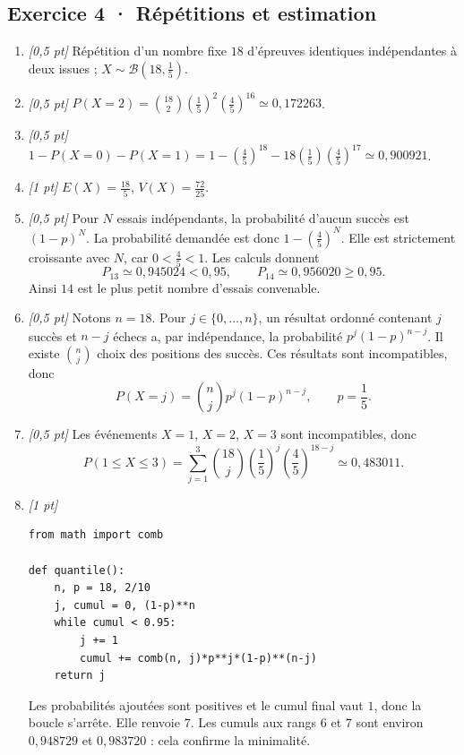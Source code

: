 \subsection*{Exercice 4 · Répétitions et estimation}\begin{enumerate}

\item \textit{[0{,}5 pt]} Répétition d'un nombre fixe $18$ d'épreuves identiques indépendantes à deux issues ; $X\sim\mathcal B(18,\frac{1}{5})$.

\item \textit{[0{,}5 pt]} $P(X=2)=\binom{18}2(\frac{1}{5})^2(\frac{4}{5})^{16}\simeq0{,}172263$.

\item \textit{[0{,}5 pt]} $1-P(X=0)-P(X=1)=1-(\frac{4}{5})^{18}-18(\frac{1}{5})(\frac{4}{5})^{17}\simeq0{,}900921$.

\item \textit{[1 pt]} $E(X)=\frac{18}{5}$, $V(X)=\frac{72}{25}$.

\item \textit{[0{,}5 pt]} Pour $N$ essais indépendants, la probabilité d'aucun succès est $(1-p)^N$. La probabilité demandée est donc $1-(\frac{4}{5})^N$. Elle est strictement croissante avec $N$, car $0<\frac{4}{5}<1$. Les calculs donnent
\[P_{13}\simeq0{,}945024<0{,}95,\qquad P_{14}\simeq0{,}956020\ge0{,}95.\]
Ainsi $14$ est le plus petit nombre d'essais convenable.

\item \textit{[0{,}5 pt]} Notons $n=18$. Pour $j\in\{0,\ldots,n\}$, un résultat ordonné contenant $j$ succès et $n-j$ échecs a, par indépendance, la probabilité $p^j(1-p)^{n-j}$. Il existe $\binom nj$ choix des positions des succès. Ces résultats sont incompatibles, donc
\[P(X=j)=\binom nj p^j(1-p)^{n-j},\qquad p=\frac{1}{5}.\]

\item \textit{[0{,}5 pt]} Les événements $X=1$, $X=2$, $X=3$ sont incompatibles, donc
\[P(1\le X\le3)=\sum_{j=1}^3\binom{18}j(\frac{1}{5})^j(\frac{4}{5})^{18-j}\simeq0{,}483011.\]


\item \textit{[1 pt]} 
\begin{lstlisting}
from math import comb

def quantile():
    n, p = 18, 2/10
    j, cumul = 0, (1-p)**n
    while cumul < 0.95:
        j += 1
        cumul += comb(n, j)*p**j*(1-p)**(n-j)
    return j
\end{lstlisting}
Les probabilités ajoutées sont positives et le cumul final vaut $1$, donc la boucle s'arrête. Elle renvoie $7$. Les cumuls aux rangs $6$ et $7$ sont environ $0{,}948729$ et $0{,}983720$ : cela confirme la minimalité.

\end{enumerate}

